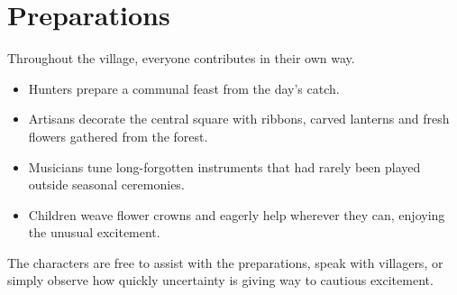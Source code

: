 \section*{Preparations}
{\entryfont Throughout the village, everyone contributes in their own way.
\begin{itemize}
	\item Hunters prepare a communal feast from the day's catch.
	\item Artisans decorate the central square with ribbons, carved lanterns and fresh flowers gathered from the forest.
	\item Musicians tune long-forgotten instruments that had rarely been played outside seasonal ceremonies.
	\item Children weave flower crowns and eagerly help wherever they can, enjoying the unusual excitement.
\end{itemize}
The characters are free to assist with the preparations, speak with villagers, or simply observe how quickly uncertainty is giving way to cautious excitement.}
